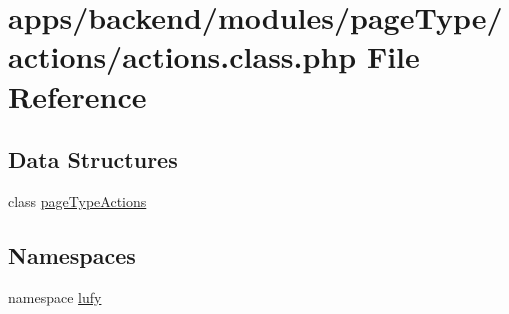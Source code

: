 \hypertarget{backend_2modules_2page_type_2actions_2actions_8class_8php}{\section{apps/backend/modules/page\-Type/actions/actions.class.\-php File Reference}
\label{backend_2modules_2page_type_2actions_2actions_8class_8php}
}
\subsection*{Data Structures}
\begin{DoxyCompactItemize}
\item 
class \hyperlink{classpage_type_actions}{page\-Type\-Actions}
\end{DoxyCompactItemize}
\subsection*{Namespaces}
\begin{DoxyCompactItemize}
\item 
namespace \hyperlink{namespacelufy}{lufy}
\end{DoxyCompactItemize}

